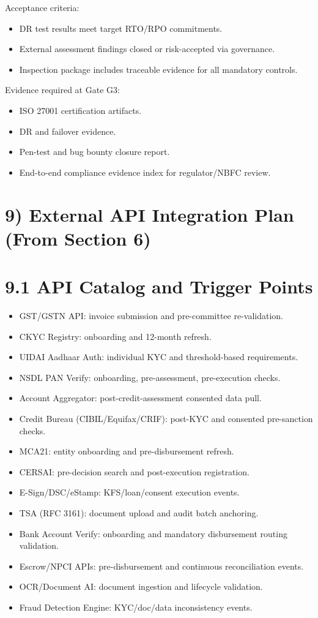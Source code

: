 ﻿\documentclass[12pt]{article}
\begin{document}
Acceptance criteria:

\begin{itemize}
\item DR test results meet target RTO/RPO commitments.
\item External assessment findings closed or risk-accepted via governance.
\item Inspection package includes traceable evidence for all mandatory controls.
\end{itemize}

Evidence required at Gate G3:

\begin{itemize}
\item ISO 27001 certification artifacts.
\item DR and failover evidence.
\item Pen-test and bug bounty closure report.
\item End-to-end compliance evidence index for regulator/NBFC review.
\end{itemize}

\section{9) External API Integration Plan (From Section 6)}


\section{9.1 API Catalog and Trigger Points}


\begin{itemize}
\item GST/GSTN API: invoice submission and pre-committee re-validation.
\item CKYC Registry: onboarding and 12-month refresh.
\item UIDAI Aadhaar Auth: individual KYC and threshold-based requirements.
\item NSDL PAN Verify: onboarding, pre-assessment, pre-execution checks.
\item Account Aggregator: post-credit-assessment consented data pull.
\item Credit Bureau (CIBIL/Equifax/CRIF): post-KYC and consented pre-sanction checks.
\item MCA21: entity onboarding and pre-disbursement refresh.
\item CERSAI: pre-decision search and post-execution registration.
\item E-Sign/DSC/eStamp: KFS/loan/consent execution events.
\item TSA (RFC 3161): document upload and audit batch anchoring.
\item Bank Account Verify: onboarding and mandatory disbursement routing validation.
\item Escrow/NPCI APIs: pre-disbursement and continuous reconciliation events.
\item OCR/Document AI: document ingestion and lifecycle validation.
\item Fraud Detection Engine: KYC/doc/data inconsistency events.
\end{itemize}
\end{document}
